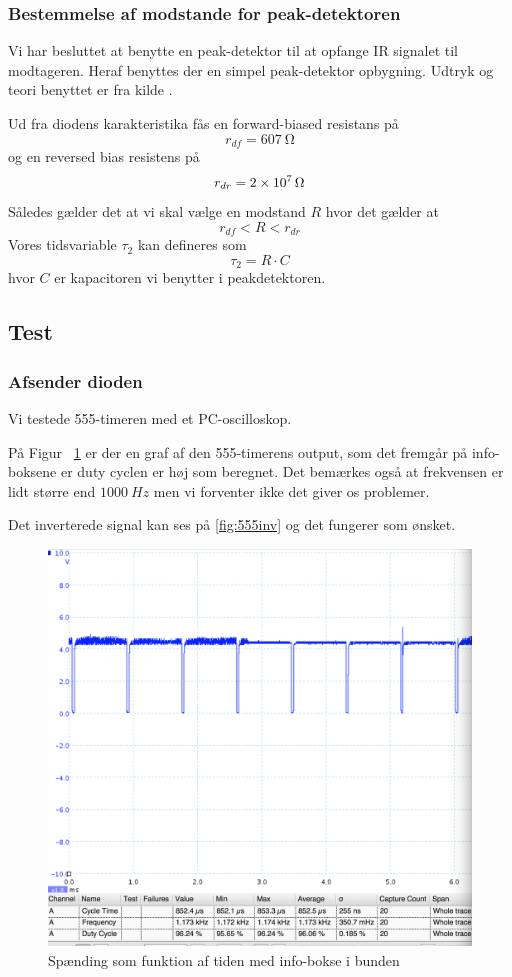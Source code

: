 \subsubsection{Bestemmelse af modstande for peak-detektoren}

Vi har besluttet at benytte en peak-detektor til at opfange IR signalet til modtageren. Heraf benyttes der en simpel peak-detektor opbygning.  Udtryk og teori benyttet er fra kilde \cite{peakdetectorCalc}.

Ud fra diodens karakteristika fås en forward-biased resistans på
\[
	r_{df} = \SI{607}{\ohm}
\]
og en reversed bias resistens på
\[
	r_{dr} = \SI{2d7}{\ohm}
\]
Således gælder det at vi skal vælge en modstand $R$ hvor det gælder at
\[
	r_{df} < R < r_{dr}
\]
Vores tidsvariable  $\tau_2$ kan defineres som
\[
	\tau_2 = R \cdot C
\]
hvor $C$ er kapacitoren vi benytter i peakdetektoren.

\subsection{Test}
\subsubsection{Afsender dioden}
Vi testede 555-timeren med et PC-oscilloskop.

På Figur ~\ref{fig:555noninv} er der en graf af den 555-timerens output, som det fremgår på info-boksene er duty cyclen er høj som beregnet. Det bemærkes også at frekvensen er lidt større end $\SI{1000}{Hz}$ men vi forventer ikke det giver os problemer.

Det inverterede signal kan ses på \ref{fig:555inv} og det fungerer som ønsket.
\begin{figure}[H]
	\centering
    \includegraphics[width=13cm]{figures/2_4_3hastighed/555signal.png}
	\caption{Spænding som funktion af tiden med info-bokse i bunden}
	\label{fig:555noninv}
\end{figure}

